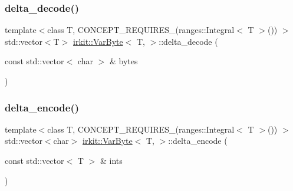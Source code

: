 \subsubsection{\texorpdfstring{delta\+\_\+decode()}{delta\_decode()}\hspace{0.1cm}{\footnotesize\ttfamily [3/3]}}
{\footnotesize\ttfamily template$<$class T, C\+O\+N\+C\+E\+P\+T\+\_\+\+R\+E\+Q\+U\+I\+R\+E\+S\+\_\+(ranges\+::\+Integral$<$ T $>$()) $>$ \\
std\+::vector$<$T$>$ \mbox{\hyperlink{structirkit_1_1VarByte}{irkit\+::\+Var\+Byte}}$<$ T, $>$\+::delta\+\_\+decode (\begin{DoxyParamCaption}\item[{const std\+::vector$<$ char $>$ \&}]{bytes }\end{DoxyParamCaption})\hspace{0.3cm}{\ttfamily [inline]}}

\mbox{\label{structirkit_1_1VarByte_a0182cbcb0c80705b7effe6cb2dc7cd6b}} 
\subsubsection{\texorpdfstring{delta\+\_\+encode()}{delta\_encode()}\hspace{0.1cm}{\footnotesize\ttfamily [1/2]}}
{\footnotesize\ttfamily template$<$class T, C\+O\+N\+C\+E\+P\+T\+\_\+\+R\+E\+Q\+U\+I\+R\+E\+S\+\_\+(ranges\+::\+Integral$<$ T $>$()) $>$ \\
std\+::vector$<$char$>$ \mbox{\hyperlink{structirkit_1_1VarByte}{irkit\+::\+Var\+Byte}}$<$ T, $>$\+::delta\+\_\+encode (\begin{DoxyParamCaption}\item[{const std\+::vector$<$ T $>$ \&}]{ints }\end{DoxyParamCaption})\hspace{0.3cm}{\ttfamily [inline]}}

\mbox{\label{structirkit_1_1VarByte_a71209f4e71eee7af72209058d17334fa}} 
